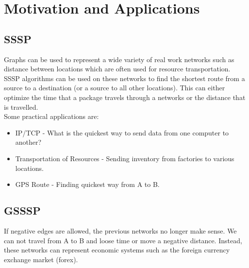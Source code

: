 \documentclass{article}
\begin{document}
\section{Motivation and Applications}
\subsection{SSSP}
Graphs can be used to represent a wide variety of real work networks such as distance between locations which are often used for resource transportation. SSSP algorithms can be used on these networks to find the shortest route from a source to a destination (or a source to all other locations). This can either optimize the time that a package travels through a networks or the distance that is travelled.\\
Some practical applications are:
\begin{itemize}
	\item IP/TCP - What is the quickest way to send data from one computer to another?
	\item Transportation of Resources - Sending inventory from factories to various locations.
	\item GPS Route - Finding quickest way from A to B. 
\end{itemize}

\subsection{GSSSP}
If negative edges are allowed, the previous networks no longer make sense. We can not travel from A to B and loose time or move a negative distance. Instead, these networks can represent economic systems such as the foreign currency exchange market (forex). 
\end{document}
